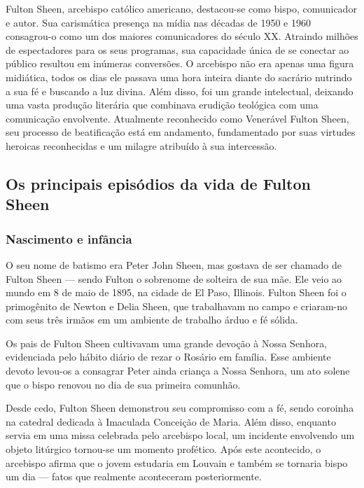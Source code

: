 \documentclass[11pt]{article}
\begin{document}
\begin{justify}


Fulton Sheen, arcebispo católico americano, destacou-se como bispo, comunicador e autor. Sua carismática presença na mídia nas décadas de 1950 e 1960 consagrou-o como um dos maiores comunicadores do século XX. Atraindo milhões de espectadores para os seus programas, sua capacidade única de se conectar ao público resultou em inúmeras conversões. O arcebispo não era apenas uma figura midiática, todos os dias ele passava uma hora inteira diante do sacrário nutrindo a sua fé e buscando a luz divina. Além disso, foi um grande intelectual, deixando uma vasta produção literária que combinava erudição teológica com uma comunicação envolvente. Atualmente reconhecido como Venerável Fulton Sheen, seu processo de beatificação está em andamento, fundamentado por suas virtudes heroicas reconhecidas e um milagre atribuído à sua intercessão.

\subsection{Os principais episódios da vida de Fulton Sheen}


\subsubsection{Nascimento e infância}

O seu nome de batismo era Peter John Sheen, mas gostava de ser chamado de Fulton Sheen — sendo Fulton o sobrenome de solteira de sua mãe. Ele veio ao mundo em 8 de maio de 1895, na cidade de El Paso, Illinois. Fulton Sheen foi o primogênito de Newton e Delia Sheen, que trabalhavam no campo e criaram-no com seus três irmãos em um ambiente de trabalho árduo e fé sólida.

Os pais de Fulton Sheen cultivavam uma grande devoção à Nossa Senhora, evidenciada pelo hábito diário de rezar o Rosário em família. Esse ambiente devoto levou-os a consagrar Peter ainda criança a Nossa Senhora, um ato solene que o bispo renovou no dia de sua primeira comunhão.

Desde cedo, Fulton Sheen demonstrou seu compromisso com a fé, sendo coroinha na catedral dedicada à Imaculada Conceição de Maria. Além disso, enquanto servia em uma missa celebrada pelo arcebispo local, um incidente envolvendo um objeto litúrgico tornou-se um momento profético. Após este acontecido, o arcebispo afirma que o jovem estudaria em Louvain e também se tornaria bispo um dia — fatos que realmente aconteceram posteriormente.


\end{justify}
\end{document}
